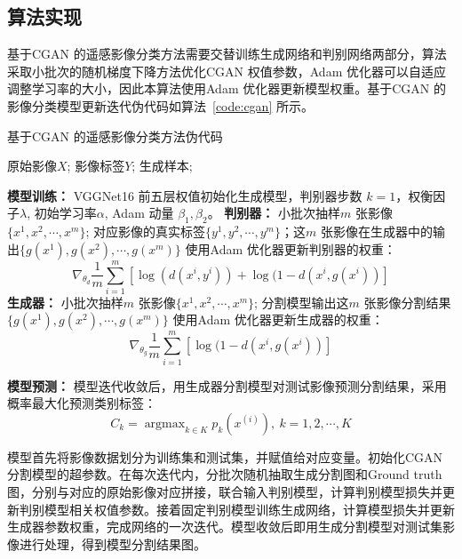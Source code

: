 \subsection{算法实现}
\label{subsec:firtst-2}

基于CGAN 的遥感影像分类方法需要交替训练生成网络和判别网络两部分，算法采取小批次的随机梯度下降方法优化CGAN 权值参数，Adam \cite{kingma2014adam} 优化器可以自适应调整学习率的大小，因此本算法使用Adam 优化器更新模型权重。基于CGAN 的影像分类模型更新迭代伪代码如算法~\ref{code:cgan} 所示。

\begin{algorithm}[!h]
  \caption{基于CGAN 的遥感影像分类方法伪代码}
  \begin{algorithmic}[1]
    \Require
    原始影像$X$; 影像标签$Y$;
    \Ensure
    生成样本;

    \textbf{模型训练：}
    \State VGGNet16 前五层权值初始化生成模型，判别器步数 $k= 1$，权衡因子$\lambda$, 初始学习率$\alpha$, Adam 动量 $\beta_1,\beta_2$。
    \State \textbf{判别器：}
    \State 小批次抽样$m$ 张影像$\{x^1,x^2,\cdots, x^m\}$; 对应影像的真实标签$\{y^1,y^2,\cdots, y^m\}$；这$m$ 张影像在生成器中的输出$\{g(x^1),g(x^2),\cdots, g(x^m) \}$
    \State 使用Adam 优化器更新判别器的权重：
    $$
      \nabla_{\theta_d} \frac{1}{m} \sum_{i=1} ^m [\log(d(x^i,y^i)) + \log(1-d(x^i,g(x^i)) ]
    $$
    \EndFor
    \State \textbf{生成器：}
    \State 小批次抽样$m$ 张影像$\{x^1,x^2,\cdots, x^m\}$;
    \State 分割模型输出这$m$ 张影像分割结果$\{g(x^1),g(x^2),\cdots, g(x^m) \}$
    \State 使用Adam 优化器更新生成器的权重：
    $$
      \nabla_{\theta_g} \frac{1}{m} \sum_{i=1} ^m [\log(1-d(x^i,g(x^i))]
    $$
    \EndFor

    \textbf{模型预测：}
    \State 模型迭代收敛后，用生成器分割模型对测试影像预测分割结果，采用概率最大化预测类别标签：
    $$
      C_k = \mathop{\arg\max}_{k \in K} p_k(x^{(i)}), \ k=1,2,\cdots,K
    $$

  \end{algorithmic}
  \label{code:cgan}
\end{algorithm}


模型首先将影像数据划分为训练集和测试集，并赋值给对应变量。初始化CGAN 分割模型的超参数。在每次迭代内，分批次随机抽取生成分割图和Ground truth 图，分别与对应的原始影像对应拼接，联合输入判别模型，计算判别模型损失并更新判别模型相关权值参数。接着固定判别模型训练生成网络，计算模型损失并更新生成器参数权重，完成网络的一次迭代。模型收敛后即用生成分割模型对测试集影像进行处理，得到模型分割结果图。


